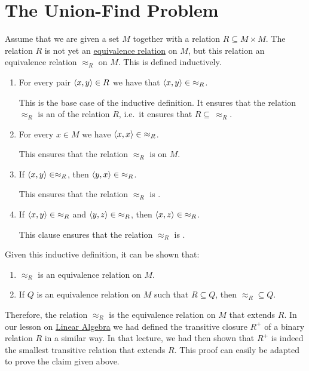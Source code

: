 \section{The Union-Find Problem}
Assume that we are given a set $M$ together with a relation $R \subseteq M \times M$.  The relation
$R$ is not yet an  \href{https://en.wikipedia.org/wiki/Equivalence_relation}{equivalence relation} on $M$, but
this relation  an equivalence relation $\approx_R$ on $M$.  This
 is defined inductively. 
\begin{enumerate}
\item For every pair $\pair(x,y) \in R$ we have that $\pair(x, y) \in\; \approx_R$.

      This is the base case of the inductive definition.  It ensures that the relation
      $\approx_R$ is an  of the relation $R$, i.e.~it ensures that $R \subseteq\, \approx_R$.
\item For every $x \in M$ we have $\pair(x,x) \in\; \approx_R$.

      This ensures that the relation $\approx_R$ is  on $M$.
\item If $\pair(x,y) \in \approx_R$, then $\pair(y,x) \in\; \approx_R$.

      This  ensures that the relation $\approx_R$ is .
\item If $\pair(x,y) \in\; \approx_R$ and $\pair(y,z) \in\; \approx_R$, then $\pair(x,z) \in\; \approx_R$.

      This clause ensures that the relation $\approx_R$ is .
\end{enumerate}
Given this inductive definition, it can be shown that:
\begin{enumerate}
\item $\approx_R$ is an equivalence relation on $M$.
\item If $Q$ is an equivalence relation on $M$ such that $R \subseteq Q$, then $\approx_R \subseteq Q$.
\end{enumerate}
Therefore, the relation $\approx_R$ is the 
equivalence relation on $M$ that extends $R$.  In our lesson on
\href{https://github.com/karlstroetmann/Lineare-Algebra/blob/master/Skript/lineare-algebra.pdf}{Linear Algebra}
we had defined the transitive closure $R^+$ of a binary relation $R$ in a similar way.  In 
that lecture, we had then shown that $R^+$ is indeed the smallest transitive relation that extends
$R$.  This proof can easily be adapted to prove the claim given above.

